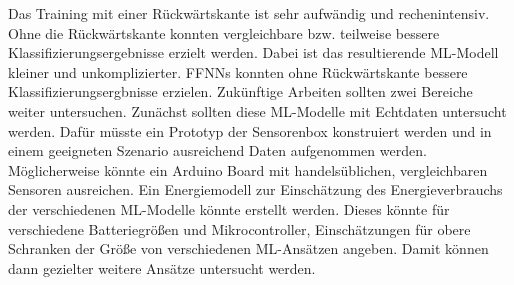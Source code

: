 \newline
\newline
Das Training mit einer Rückwärtskante ist sehr aufwändig und rechenintensiv.
Ohne die Rückwärtskante konnten vergleichbare bzw. teilweise bessere Klassifizierungsergebnisse erzielt werden.
Dabei ist das resultierende ML-Modell kleiner und unkomplizierter.
FFNNs konnten ohne Rückwärtskante bessere Klassifizierungsergbnisse erzielen.
\newline
\newline
Zukünftige Arbeiten sollten zwei Bereiche weiter untersuchen.
Zunächst sollten diese ML-Modelle mit Echtdaten untersucht werden.
Dafür müsste ein Prototyp der Sensorenbox konstruiert werden und in
einem geeigneten Szenario ausreichend Daten aufgenommen werden.
Möglicherweise könnte ein Arduino Board mit handelsüblichen, vergleichbaren Sensoren ausreichen.
\newline
\newline
Ein Energiemodell zur Einschätzung des Energieverbrauchs der verschiedenen ML-Modelle könnte erstellt werden.
Dieses könnte für verschiedene Batteriegrößen und Mikrocontroller, Einschätzungen für obere Schranken der Größe von
verschiedenen ML-Ansätzen angeben.
Damit können dann gezielter weitere Ansätze untersucht werden.